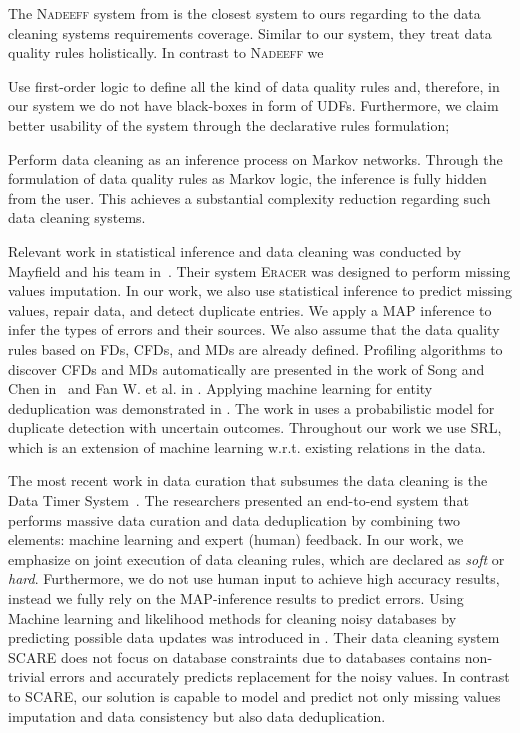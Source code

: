 The \textsc{Nadeeff} system from \cite{Dallachiesa:2013:NCD:2463676.2465327} is the closest system to ours regarding to the data cleaning systems requirements coverage. Similar to our system, they treat data quality rules holistically. In contrast to \textsc{Nadeeff} we 
\begin{inparaenum}[\itshape 1\upshape)]
	\item Use first-order logic to define all the kind of data quality rules and, therefore, in our system we do not have black-boxes in form of UDFs. Furthermore, we claim better usability of the system through the declarative rules formulation;
	\item Perform data cleaning as an inference process on Markov networks. Through the formulation of data quality rules as Markov logic, the inference is fully hidden from the user. This achieves a substantial complexity reduction regarding such data cleaning systems.
\end{inparaenum}  

Relevant work in statistical inference and data cleaning was conducted by Mayfield and his team in~\cite{Mayfield:2010:EDA:1807167.1807178}. Their system \textsc{Eracer} was designed to perform missing values imputation. In our work, we also use statistical inference to predict missing values, repair data, and detect duplicate entries. We apply a MAP inference to infer the types of errors and their sources. We also assume that the data quality rules based on FDs, CFDs, and MDs are already defined. Profiling algorithms to discover CFDs and MDs automatically are presented in the work of Song and Chen in~\cite{song2009discovering} and Fan W. et al. in \cite{Fan:2011:DCF:1978258.1978514}. Applying machine learning for entity deduplication was demonstrated in \cite{guo2010record}. The work in \cite{beskales2010probclean} uses a probabilistic model for duplicate detection with uncertain outcomes. Throughout our work we use SRL, which is an extension of machine learning w.r.t. existing relations in the data.

The most recent work in data curation that subsumes the data cleaning is the Data Timer System~\cite{Stonebraker_datacuration}. The researchers presented an end-to-end system that performs massive data curation and data deduplication by combining two elements: machine learning and expert (human) feedback. In our work, we emphasize on joint execution of data cleaning rules, which are declared as \textit{soft} or \textit{hard}. Furthermore, we do not use human input to achieve high accuracy results, instead we fully rely on the MAP-inference results to predict errors. Using Machine learning and likelihood methods for cleaning noisy databases by predicting possible data updates was introduced in \cite{Yakout:2013:DSU:2463676.2463706}. Their data cleaning system \textsc{SCARE} does not focus on database constraints due to databases contains non-trivial errors and accurately predicts replacement for the noisy values. In contrast to \textsc{SCARE}, our solution is capable to model and predict not only missing values imputation and data consistency but also data deduplication. 

